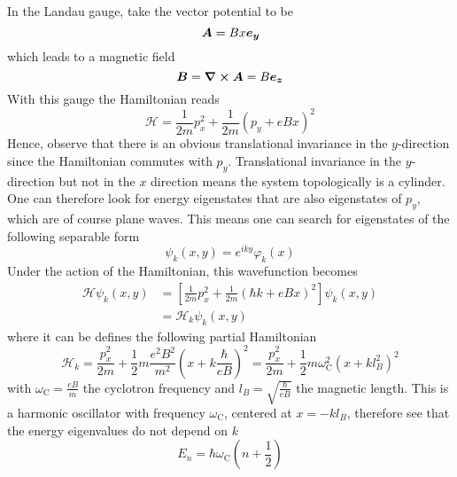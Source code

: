 		In the Landau gauge, take the vector potential to be
		\begin{equation}
		    \vb*{A}=Bx\vb*{e_y}
		\end{equation}
		which leads to a magnetic field
		\begin{equation}
		    \vb*{B}=\curl{\vb*{A}}=B\vb*{e_z}
		\end{equation}
		With this gauge the Hamiltonian reads
		\begin{equation}
		    \mathcal{H}=\frac{1}{2m}p_x^2+\frac{1}{2m}\left(p_y+eBx\right)^2
		\end{equation}
		Hence, observe that there is an obvious translational invariance in the $y$-direction since the Hamiltonian commutes with $p_y$. Translational invariance in the $y$-direction but not in the $x$ direction means the system topologically is a cylinder. One can therefore look for energy eigenstates that are also eigenstates of $p_y$, which are of course plane waves. This means one can search for eigenstates of the following separable form
		\begin{equation}
		    \psi_k(x,y)=e^{iky}\varphi_k(x)
		\end{equation}
		Under the action of the Hamiltonian, this wavefunction becomes
		\begin{equation} \begin{split}
		    \mathcal{H}\psi_k(x,y) &=\left[\frac{1}{2m}p_x^2+\frac{1}{2m}\left(\hbar k+eBx\right)^2\right]\psi_k(x,y) \\ &= \mathcal{H}_k\psi_k(x,y)
		\end{split}
		\end{equation}
		where it can be defines the following partial Hamiltonian
		\begin{equation}
		    \mathcal{H}_k=\frac{p_x^2}{2m}+\frac{1}{2}m\frac{e^2B^2}{m^2}\left(x+k\frac{\hbar}{eB}\right)^2=\frac{p_x^2}{2m}+\frac{1}{2}m\omega_\text{C}^2\left(x+kl_B^2\right)^2
		\end{equation}
		with $\omega_\text{C}=\frac{eB}{m}$ the cyclotron frequency and $l_B=\sqrt{\frac{\hbar}{eB}}$ the magnetic length. This is a harmonic oscillator with frequency $\omega_\text{C}$, centered at $x=-kl_B$, therefore see that the energy eigenvalues do not depend on $k$
		\begin{equation}
		    E_n=\hbar\omega_\text{C}\left(n+\frac12\right)
		\end{equation}\\

